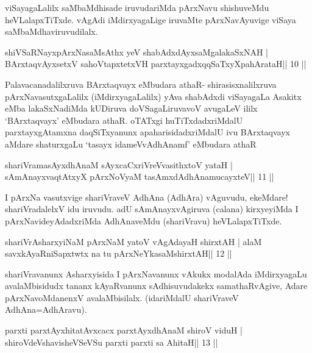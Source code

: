 \begin{artha}
viSayagaLalilx saMbaMdhisade iruvudariMda pArxNavu shishuveMdu heVLalapxTiTxde. vAgAdi iMdirxyagaLige iruvaMte pArxNavAyuvige viSaya saMbaMdhaviruvudilalx.
\end{artha}

\begin{shl}
shiVSaRNayxpArxNasaMsAthx yeV shabAdxdAyxsaMgalakaSxNAH |
BArxtaqvAyxsetxV sahoVtapxtetxVH parxtayxgadxqqSaTxyXpahArataH\hfill || 10 ||
\end{shl}

\begin{artha}
Palavacanadalilxruva BArxtaqvayx eMbudara athaR- shirasisxnalilxruva
pArxNavasutxgaLalilx (iMdirxyagaLalilx) yAva shabAdxdi viSayagaLa
Asakitx eMba lakaSxNadiMda kUDiruva doVSagaLiruvavoV avugaLeV ililx
`BArxtaqvayx' eMbudara athaR. oTATxgi huTiTxdadxriMdalU
parxtayxgAtamxna daqSiTxyanunx apaharisidadxriMdalU ivu BArxtaqvayx
aMdare shaturxgaLu `tasayx idameVvA\s\s dhAnamf' eMbudara athaR
\end{artha}

\begin{shl}
shariVramasAyx\s\s dhAnaM sAyxcaCxriVreV\s vasithxtoV yataH |
sAmAnayxvaqtAtxyX pArxNoV\s yaM tasAmxdAdhAnamucayxteV\hfill || 11 ||
\end{shl}

\begin{artha}
I pArxNa vasutxvige shariVraveV AdhAna (AdhAra) vAguvudu, ekeMdare! shariVradalelxV idu iruvudu. adU sAmAnayxvAgiruva (calana) kirxyeyiMda I pArxNavideyAdadxriMda AdhAnaveMdu (shariVravu) heVLalapxTiTxde.
\end{artha}

\begin{shl}
shariVrAsharxyiNaM pArxNaM yatoV vAgAdayaH shirxtAH |
alaM savxkAyaRniSapxtwtx na tu pArxNeYkasaMshirxtAH\hfill || 12 ||
\end{shl}

\begin{artha}
shariVravanunx Asharxyisida I pArxNavanunx vAkukx modalAda iMdirxyagaLu avalaMbisidudx tananx kAyaRvanunx sAdhisuvudakekx samathaRvAgive, Adare pArxNavoMdanenxV avalaMbisilalx. (idariMdalU shariVraveV AdhAna=AdhAravu).
\end{artha}



\begin{shl}
parxti parxtAyxhitatAvxcacx parxtAyxdhAnaM shiroV viduH |
shiroVdeVshavisheVSeVSu parxti parxti sa AhitaH\hfill || 13 ||
\end{shl}

